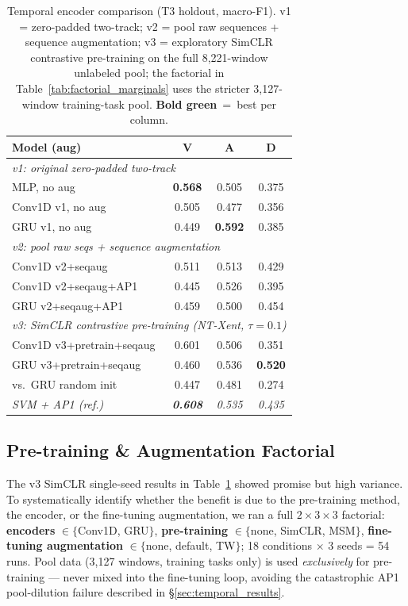 \documentclass[sigconf,review,anonymous]{acmart}
\newcommand{\best}[1]{\textbf{\textcolor{bestcol}{#1}}}
\begin{document}
\begin{table}[t]
\caption{Temporal encoder comparison (T3 holdout, macro-F1). v1 = zero-padded two-track;
  v2 = pool raw sequences + sequence augmentation;
  v3 = exploratory SimCLR contrastive pre-training on the full 8{,}221-window
  unlabeled pool; the factorial in Table~\ref{tab:factorial_marginals} uses the
  stricter 3{,}127-window training-task pool.
  \best{Bold green}~=~best per column.}
\label{tab:temporal_models}
\centering
\setlength{\tabcolsep}{4pt}
\small
\begin{tabular}{lccc}
\toprule
\textbf{Model (aug)} & \textbf{V} & \textbf{A} & \textbf{D} \\
\midrule
\multicolumn{4}{l}{\textit{v1: original zero-padded two-track}} \\
MLP, no aug         & \best{0.568} & 0.505 & 0.375 \\
Conv1D v1, no aug   & 0.505 & 0.477 & 0.356 \\
GRU v1, no aug      & 0.449 & \best{0.592} & 0.385 \\
\midrule
\multicolumn{4}{l}{\textit{v2: pool raw seqs + sequence augmentation}} \\
Conv1D v2+seqaug    & 0.511 & 0.513 & 0.429 \\
Conv1D v2+seqaug+AP1& 0.445 & 0.526 & 0.395 \\
GRU v2+seqaug+AP1   & 0.459 & 0.500 & 0.454 \\
\midrule
\multicolumn{4}{l}{\textit{v3: SimCLR contrastive pre-training (NT-Xent, $\tau{=}0.1$)}} \\
Conv1D v3+pretrain+seqaug & 0.601 & 0.506 & 0.351 \\
GRU v3+pretrain+seqaug    & 0.460 & 0.536 & \best{0.520} \\
\quad vs.\ GRU random init& 0.447 & 0.481 & 0.274 \\
\midrule
\textit{SVM + AP1 (ref.)} & \textit{\best{0.608}} & \textit{0.535} & \textit{0.435} \\
\bottomrule
\end{tabular}
\end{table}

\subsection{Pre-training \& Augmentation Factorial}
\label{sec:factorial}

The v3 SimCLR single-seed results in Table~\ref{tab:temporal_models} showed
promise but high variance.
To systematically identify whether the benefit is due to the pre-training
method, the encoder, or the fine-tuning augmentation, we ran a full
$2{\times}3{\times}3$ factorial:
\textbf{encoders} $\in \{$Conv1D, GRU$\}$,
\textbf{pre-training} $\in \{$none, SimCLR, MSM$\}$,
\textbf{fine-tuning augmentation} $\in \{$none, default, TW$\}$;
18 conditions $\times$ 3 seeds = 54 runs.
Pool data (3{,}127 windows, training tasks only) is used \emph{exclusively}
for pre-training --- never mixed into the fine-tuning loop, avoiding the
catastrophic AP1 pool-dilution failure described in \S\ref{sec:temporal_results}.
\end{document}
